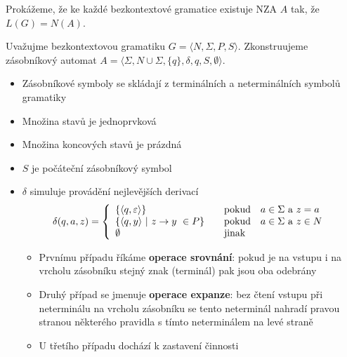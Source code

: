 \documentclass[10pt, a4paper, titlepage]{article}
\theoremstyle{note}
\begin{document}
Prokážeme, že ke každé bezkontextové gramatice existuje NZA $A$ tak, že $L(G)=N(A)$.

Uvažujme bezkontextovou gramatiku $G = \langle N,\Sigma,P,S \rangle$. Zkonstruujeme zásobníkový automat $A = \langle \Sigma,N \cup \Sigma,\lbrace q \rbrace,\delta,q,S,\emptyset \rangle$.

\begin{itemize}
\item
Zásobníkové symboly se skládají z terminálních a neterminálních symbolů gramatiky
\item
Množina stavů je jednoprvková
\item
Množina koncových stavů je prázdná
\item
$S$ je počáteční zásobníkový symbol
\item
$\delta$ simuluje provádění nejlevějších derivací
$$
\delta(q,a,z)=\left\{
\begin{array}{l@{\quad\mbox{}\quad}l}
\lbrace \langle q, \varepsilon \rangle \rbrace & \text{pokud}\quad a \in \Sigma\ \text{a}\ z=a\\
\lbrace \langle q,y \rangle\ |\ z\rightarrow y\ \in P \rbrace & \text{pokud}\quad a \in \Sigma\ \text{a}\ z \in N\\
\emptyset & \text{jinak}
\end{array}
\right.
$$

\begin{itemize}
\item
Prvnímu případu říkáme \textbf{operace srovnání}: pokud je na vstupu i na vrcholu zásobníku stejný znak (terminál) pak jsou oba odebrány
\item
Druhý případ se jmenuje \textbf{operace expanze}: bez čtení vstupu při neterminálu na vrcholu zásobníku se tento neterminál nahradí pravou stranou některého pravidla s tímto neterminálem na levé straně
\item
U třetího případu dochází k zastavení činnosti
\end{itemize}
\end{itemize}
\end{document}
